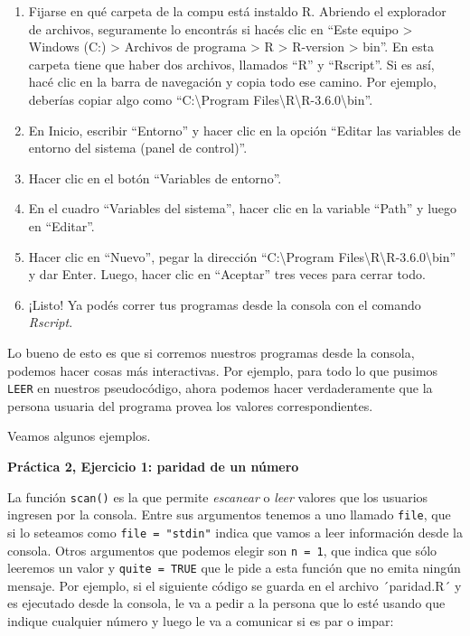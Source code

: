 \documentclass[
]{book}
\providecommand{\tightlist}{%
  \setlength{\itemsep}{0pt}\setlength{\parskip}{0pt}}
\begin{document}
\begin{enumerate}
\def\labelenumi{\arabic{enumi}.}
\tightlist
\item
  Fijarse en qué carpeta de la compu está instaldo R. Abriendo el explorador de archivos, seguramente lo encontrás si hacés clic en ``Este equipo \textgreater{} Windows (C:) \textgreater{} Archivos de programa \textgreater{} R \textgreater{} R-version \textgreater{} bin''. En esta carpeta tiene que haber dos archivos, llamados ``R'' y ``Rscript''. Si es así, hacé clic en la barra de navegación y copia todo ese camino. Por ejemplo, deberías copiar algo como ``C:\textbackslash Program Files\textbackslash R\textbackslash R-3.6.0\textbackslash bin''.
\item
  En Inicio, escribir ``Entorno'' y hacer clic en la opción ``Editar las variables de entorno del sistema (panel de control)''.
\item
  Hacer clic en el botón ``Variables de entorno''.
\item
  En el cuadro ``Variables del sistema'', hacer clic en la variable ``Path'' y luego en ``Editar''.
\item
  Hacer clic en ``Nuevo'', pegar la dirección ``C:\textbackslash Program Files\textbackslash R\textbackslash R-3.6.0\textbackslash bin'' y dar Enter. Luego, hacer clic en ``Aceptar'' tres veces para cerrar todo.
\item
  ¡Listo! Ya podés correr tus programas desde la consola con el comando \emph{Rscript}.
\end{enumerate}

Lo bueno de esto es que si corremos nuestros programas desde la consola, podemos hacer cosas más interactivas. Por ejemplo, para todo lo que pusimos \texttt{LEER} en nuestros pseudocódigo, ahora podemos hacer verdaderamente que la persona usuaria del programa provea los valores correspondientes.

Veamos algunos ejemplos.

\textbf{Práctica 2, Ejercicio 1: paridad de un número}

La función \texttt{scan()} es la que permite \emph{escanear} o \emph{leer} valores que los usuarios ingresen por la consola. Entre sus argumentos tenemos a uno llamado \texttt{file}, que si lo seteamos como \texttt{file\ =\ "stdin"} indica que vamos a leer información desde la consola. Otros argumentos que podemos elegir son \texttt{n\ =\ 1}, que indica que sólo leeremos un valor y \texttt{quite\ =\ TRUE} que le pide a esta función que no emita ningún mensaje. Por ejemplo, si el siguiente código se guarda en el archivo ´paridad.R´ y es ejecutado desde la consola, le va a pedir a la persona que lo esté usando que indique cualquier número y luego le va a comunicar si es par o impar:
\end{document}
